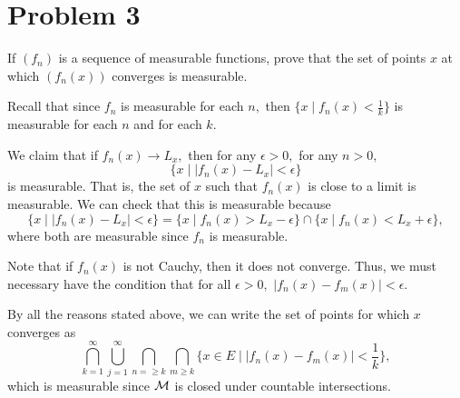 \documentclass[11pt]{article}
\begin{document}
\section*{Problem 3}
\begin{problem}
    If $(f_n)$ is a sequence of measurable functions, prove that the set of points $x$ at which $(f_n(x))$ converges is measurable.
\end{problem}
\begin{solution}
    Recall that since $f_n$ is measurable for each $n,$ then 
    $\{x \mid f_n(x) < \frac{1}{k}\}$ is measurable for each $n$ and for each $k.$ 

    We claim that if $f_n(x) \to L_x,$ then for any $\epsilon>0,$ for any $n>0,$
    \[\{x \mid |f_n(x) - L_x| < \epsilon\}\] is measurable. That is, the set of $x$ such that $f_n(x)$ is close to a limit is measurable. We can check that this is measurable because 
    \[\{x \mid |f_n(x) - L_x| < \epsilon\} = \{x \mid f_n(x) > L_x - \epsilon\} \cap \{x \mid f_n(x) < L_x + \epsilon\},\] where both are measurable since $f_n$ is measurable.

    Note that if $f_n(x)$ is not Cauchy, then it does not converge. Thus, we must necessary have the condition that for all $\epsilon>0,$ $|f_n(x) - f_m(x)| < \epsilon.$

    By all the reasons stated above, we can write the set of points for which $x$ converges as 
    \[\bigcap_{k=1}^\infty \bigcup_{j = 1}^\infty\bigcap_{n=\geq k} \bigcap_{m \geq k}\{x \in E \mid |f_n(x) - f_m(x)| < \frac{1}{k}\},\] which is measurable since $\cal M$ is closed under countable intersections.
\end{solution}

\newpage
\end{document}
